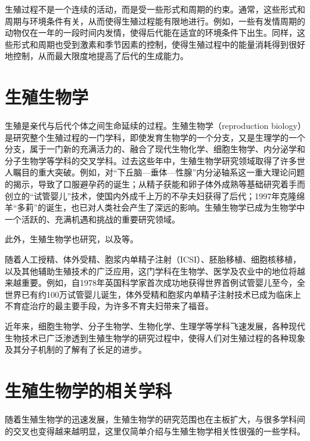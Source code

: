生殖过程不是一个连续的活动，而是受一些形式和周期的约束。通常，这些形式和周期与环境条件有关，从而使得生殖过程能有限地进行。例如，一些有发情周期的动物仅在一年的一段时间内发情，使得后代能在适宜的环境条件下出生。同样，这些形式和周期也受到激素和季节因素的控制，使得生殖过程中的能量消耗得到很好地控制，从而最大限度地提高了后代的生成能力。

\section{生殖生物学}

生殖是亲代与后代个体之间生命延续的过程。生殖生物学（reproduction biology）是研究整个生殖过程的一门学科，即使发育生物学的一个分支，又是生理学的一个分支，属于一门新的充满活力的、融合了现代生物化学、细胞生物学、内分泌学和分子生物学等学科的交叉学科。过去这些年中，生殖生物学研究领域取得了许多世人瞩目的重大突破。例如，对“下丘脑---垂体---性腺”内分泌轴系这一重大理论问题的揭示，导致了口服避孕药的诞生；从精子获能和卵子体外成熟等基础研究着手而创立的“试管婴儿”技术，使国内外成千上万的不孕夫妇获得了后代；1997年克隆绵羊“多莉”的诞生，也已对人类社会产生了深远的影响。生殖生物学已成为生物学中一个活跃的、充满机遇和挑战的重要研究领域。

此外，生殖生物学也研究，以及等。

随着人工授精、体外受精、胞浆内单精子注射（ICSI）、胚胎移植、细胞核移植，以及其他辅助生殖技术的广泛应用，这门学科在生物学、医学及农业中的地位将越来越重要。例如，自1978年英国科学家首次成功地获得世界首例试管婴儿至今，全世界已有约100万试管婴儿诞生，体外受精和胞浆内单精子注射技术已成为临床上不育症治疗的最主要手段，为许多不育夫妇带来了福音。

近年来，细胞生物学、分子生物学、生物化学、生理学等学科飞速发展，各种现代生物技术已广泛渗透到生殖生物学的研究过程中，使得人们对生殖过程的各种现象及其分子机制的了解有了长足的进步。

\section{生殖生物学的相关学科}

随着生殖生物学的迅速发展，生殖生物学的研究范围也在主板扩大，与很多学科间的交叉也变得越来越明显，这里仅简单介绍与生殖生物学相关性很强的一些学科。

